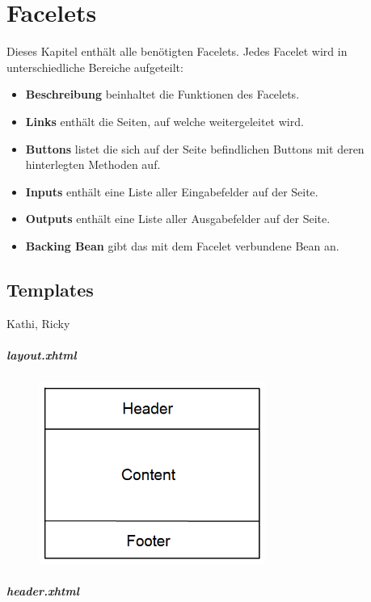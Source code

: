 \chapter{Facelets}

	Dieses Kapitel enthält alle benötigten  Facelets. Jedes Facelet wird in unterschiedliche  Bereiche aufgeteilt:
	\begin{itemize}
		\item \textbf{Beschreibung} beinhaltet die Funktionen des Facelets.
		\item \textbf{Links} enthält die Seiten, auf welche weitergeleitet wird.
		\item \textbf{Buttons} listet die sich auf der Seite befindlichen Buttons mit deren hinterlegten Methoden auf.
		\item \textbf{Inputs} enthält eine Liste aller Eingabefelder auf der Seite.
		\item \textbf{Outputs} enthält eine Liste aller Ausgabefelder auf der Seite.
		\item \textbf{Backing Bean} gibt das mit dem Facelet verbundene Bean an.
	\end{itemize}
	
	\section{Templates}
		Kathi, Ricky
	
		\paragraph{layout.xhtml}
			\begin{figure}[ht]
				\centering
				\includegraphics[width=0.66\textwidth, angle=0]{Grafiken/Template.png}
			\end{figure}
			
		\paragraph{header.xhtml}
		
